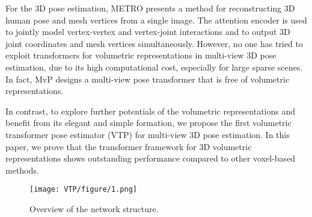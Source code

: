 \documentclass[lettersize,journal]{IEEEtran}
\begin{document}
\par For the 3D pose estimation, METRO \cite{lin2021end} presents a method for reconstructing 3D human pose and mesh vertices from a single image. The attention encoder is used to jointly model vertex-vertex and vertex-joint interactions and to output 3D joint coordinates and mesh vertices simultaneously.
However, no one has tried to exploit transformers for volumetric representations in multi-view 3D pose estimation, due to its high computational cost, especially for large sparse scenes. In fact, MvP \cite{zhang2021direct} designs a multi-view pose transformer that is free of volumetric representations. 
\par In contrast, to explore further potentials of the volumetric representations and benefit from its elegant and simple formation, we propose the first volumetric transformer pose estimator (VTP) for multi-view 3D pose estimation. In this paper, we prove that the transformer framework for 3D volumetric representations shows outstanding performance compared to other voxel-based methods.

\begin{figure*}[h]
  \texttt{[image: VTP/figure/1.png]}
  \caption{Overview of the network structure.}
  \label{overview}
\end{figure*}
\end{document}
